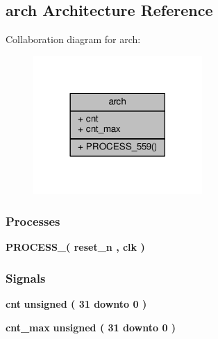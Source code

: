 \subsection{arch Architecture Reference}
\label{classpulse__gen_1_1arch}


Collaboration diagram for arch\+:\nopagebreak
\begin{figure}[H]
\begin{center}
\leavevmode
\includegraphics[width=182pt]{d5/d5d/classpulse__gen_1_1arch__coll__graph}
\end{center}
\end{figure}
\subsubsection*{Processes}
 \begin{DoxyCompactItemize}
\item 
{\bf P\+R\+O\+C\+E\+S\+S\+\_}{\bfseries  ( {\bfseries {\bfseries {\bf reset\+\_\+n}} \textcolor{vhdlchar}{ }} , {\bfseries {\bfseries {\bf clk}} \textcolor{vhdlchar}{ }} )}
\end{DoxyCompactItemize}
\subsubsection*{Signals}
 \begin{DoxyCompactItemize}
\item 
{\bf cnt} {\bfseries \textcolor{comment}{unsigned}\textcolor{vhdlchar}{ }\textcolor{vhdlchar}{(}\textcolor{vhdlchar}{ }\textcolor{vhdlchar}{ } \textcolor{vhdldigit}{31} \textcolor{vhdlchar}{ }\textcolor{keywordflow}{downto}\textcolor{vhdlchar}{ }\textcolor{vhdlchar}{ } \textcolor{vhdldigit}{0} \textcolor{vhdlchar}{ }\textcolor{vhdlchar}{)}\textcolor{vhdlchar}{ }} 
\item 
{\bf cnt\+\_\+max} {\bfseries \textcolor{comment}{unsigned}\textcolor{vhdlchar}{ }\textcolor{vhdlchar}{(}\textcolor{vhdlchar}{ }\textcolor{vhdlchar}{ } \textcolor{vhdldigit}{31} \textcolor{vhdlchar}{ }\textcolor{keywordflow}{downto}\textcolor{vhdlchar}{ }\textcolor{vhdlchar}{ } \textcolor{vhdldigit}{0} \textcolor{vhdlchar}{ }\textcolor{vhdlchar}{)}\textcolor{vhdlchar}{ }} 
\end{DoxyCompactItemize}


